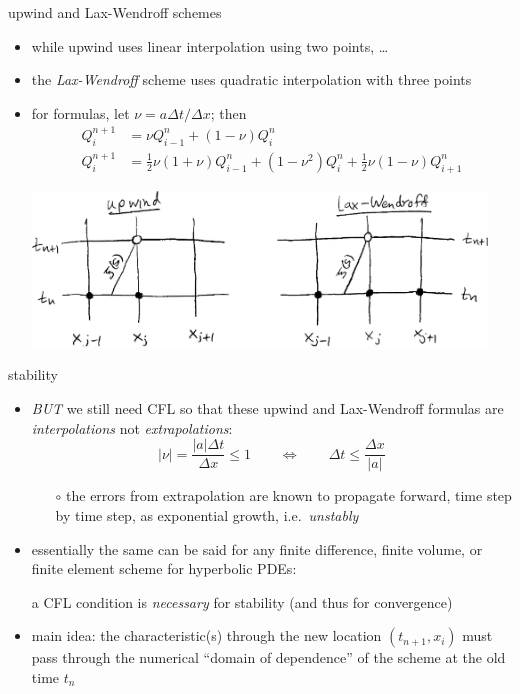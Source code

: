 \documentclass[10pt,hyperref]{beamer}
\begin{document}
\begin{frame}{upwind and Lax-Wendroff schemes}

\begin{itemize}
\item while upwind uses linear interpolation using two points, \dots
\item the \emph{Lax-Wendroff} scheme uses quadratic interpolation with three points
\item for formulas, let $\nu = a\Delta t/\Delta x$; then
\begin{align*}
Q_i^{n+1} &= \nu Q_{i-1}^n + \left(1 - \nu\right) Q_i^n \\
Q_i^{n+1} &= \tfrac{1}{2} \nu (1+\nu) Q_{i-1}^n + \left(1 - \nu^2\right) Q_i^n + \tfrac{1}{2} \nu (1-\nu) Q_{i+1}^n
\end{align*}

\begin{center}
\includegraphics[width=0.95\textwidth]{figs/stencilssketch}
\end{center}
\end{itemize}
\end{frame}


\begin{frame}{stability}

\begin{itemize}
\item \emph{BUT} we still need CFL so that these upwind and Lax-Wendroff formulas are \emph{interpolations} not \emph{extrapolations}:
    $$|\nu| = \frac{|a|\Delta t}{\Delta x} \le 1 \qquad \iff \qquad \Delta t \le \frac{\Delta x}{|a|}$$

    \begin{itemize}
    \item[$\circ$] the errors from extrapolation are known to propagate forward, time step by time step, as exponential growth, i.e.~\emph{unstably}
    \end{itemize}
\item essentially the same can be said for any finite difference, finite volume, or finite element scheme for hyperbolic PDEs:

\begin{center}
a CFL condition is \emph{necessary} for stability (and thus for convergence)
\end{center}

\item \alert{main idea:} the characteristic(s) through the new location $(t_{n+1},x_i)$ must pass through the numerical ``domain of dependence'' of the scheme at the old time $t_n$
\end{itemize}
\end{frame}
\end{document}
